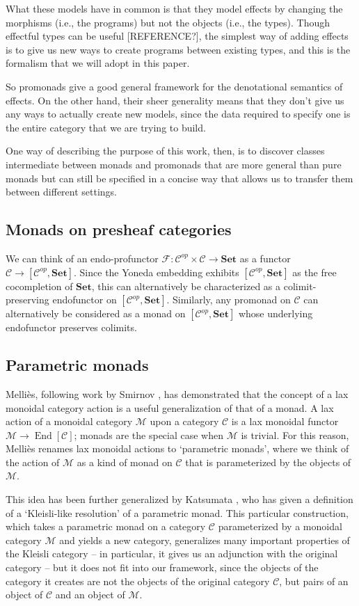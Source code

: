 \documentclass{svproc}
\newcommand\C{\mathcal{C}}
\newcommand\F{\mathcal{F}}
\newcommand\M{\mathcal{M}}
\DeclareMathOperator{\End}{End}
\newcommand\Mellies{Melli\`{e}s\xspace}
\newcommand*\from{\colon}
\newcommand{\0}{{\mathtt{0}}} \newcommand{\com}{{\mathtt{com}}}
\newcommand{\catname}[1]{\mathbf{#1}}
\newcommand{\Set}{\catname{Set}}
\begin{document}
What these models have in common is that they model effects by changing the morphisms (i.e., the programs) but not the objects (i.e., the types).  
Though effectful types can be useful [REFERENCE?], the simplest way of adding effects is to give us new ways to create programs between existing types, and this is the formalism that we will adopt in this paper.

So promonads give a good general framework for the denotational semantics of effects.
On the other hand, their sheer generality means that they don't give us any ways to actually create new models, since the data required to specify one is the entire category that we are trying to build.

One way of describing the purpose of this work, then, is to discover classes intermediate between monads and promonads that are more general than pure monads but can still be specified in a concise way that allows us to transfer them between different settings.

\subsection{Monads on presheaf categories}

We can think of an endo-profunctor $\F\from \C^{op}\times\C\to \Set$ as a functor $\C\to [\C^{op},\Set]$.  
Since the Yoneda embedding exhibits $[\C^{op},\Set]$ as the free cocompletion of $\Set$, this can alternatively be characterized as a colimit-preserving endofunctor on $[\C^{op},\Set]$.  
Similarly, any promonad on $\C$ can alternatively be considered as a monad on $[\C^{op},\Set]$ whose underlying endofunctor preserves colimits.

\subsection{Parametric monads}

\Mellies \cite{ParametricMonads}, following work by Smirnov \cite{Smirnov2008}, has demonstrated that the concept of a lax monoidal category action is a useful generalization of that of a monad.  
A lax action of a monoidal category $\M$ upon a category $\C$ is a lax monoidal functor $\M\to \End[\C]$; monads are the special case when $\M$ is trivial.  
For this reason, \Mellies renames lax monoidal actions to `parametric monads', where we think of the action of $\M$ as a kind of monad on $\C$ that is parameterized by the objects of $\M$.

This idea has been further generalized by Katsumata \cite{Katsu}, who has given a definition of a `Kleisli-like resolution' of a parametric monad.  
This particular construction, which takes a parametric monad on a category $\C$ parameterized by a monoidal category $\M$ and yields a new category, generalizes many important properties of the Kleisli category -- in particular, it gives us an adjunction with the original category -- but it does not fit into our framework, since the objects of the category it creates are not the objects of the original category $\C$, but pairs of an object of $\C$ and an object of $\M$.
\end{document}
